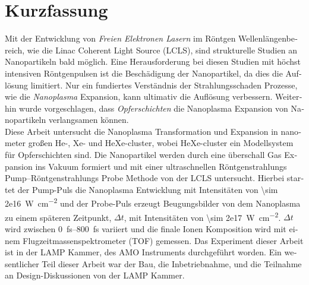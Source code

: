 \section*{Kurzfassung}
\begin{otherlanguage}{german}
Mit der Entwicklung von \textit{Freien Elektronen Lasern} im Röntgen Wellenlängenbereich, wie die Linac Coherent Light Source (LCLS), sind strukturelle Studien an Nanopartikeln bald möglich. Eine Herausforderung bei diesen Studien mit höchst intensiven Röntgenpulsen ist die Beschädigung der Nanopartikel, da dies die Auflösung limitiert. Nur ein fundiertes Verständnis der Strahlungsschaden Prozesse, wie die \textit{Nanoplasma} Expansion, kann ultimativ die Auflösung verbessern. Weiterhin wurde vorgeschlagen, dass \textit{Opferschichten} die Nanoplasma Expansion von Nanopartikeln verlangsamen können.\\[0.4\baselineskip]
%
Diese Arbeit untersucht die Nanoplasma Transformation und Expansion in nanometer großen He-, Xe- und HeXe-cluster, wobei HeXe-cluster ein Modellsystem für Opferschichten sind. Die Nanopartikel werden durch eine überschall Gas Expansion ins Vakuum formiert und mit einer ultraschnellen Röntgenstrahlungs Pump--Röntgenstrahlungs Probe Methode von der LCLS untersucht. Hierbei startet der Pump-Puls die Nanoplasma Entwicklung mit Intensitäten von \SI{\sim 2e16}{\watt\per\square\centi\meter} und der Probe-Puls erzeugt Beugungsbilder von dem Nanoplasma zu einem späteren Zeitpunkt, $\Delta t$, mit Intensitäten von \SI{\sim 2e17}{\watt\per\square\centi\meter}. $\Delta t$ wird zwischen \SIrange{0}{800}{\femto\second} variiert und die finale Ionen Komposition wird mit einem Flugzeitmassenspektrometer (TOF) gemessen. Das Experiment dieser Arbeit ist in der LAMP Kammer, des AMO Instruments durchgeführt worden. Ein wesentlicher Teil dieser Arbeit war der Bau, die Inbetriebnahme, und die Teilnahme an Design-Diskussionen von der LAMP Kammer.\\[0.4\baselineskip]
%

\end{otherlanguage}
